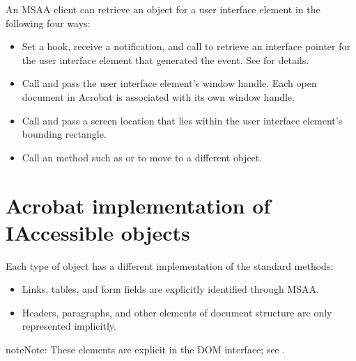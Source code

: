 \documentclass[letterpaper,12pt,english,openany,oneside]{sphinxmanual}
\begin{document}
An MSAA client can retrieve an  object for a user interface element in the following four ways:
\begin{itemize}
\item {} 
Set a  hook, receive a notification, and call  to retrieve an  interface pointer for the user interface element that generated the event. See  for details.

\item {} 
Call  and pass the user interface element’s window handle. Each open document in Acrobat is associated with its own window handle.

\item {} 
Call  and pass a screen location that lies within the user interface element’s bounding rectangle.

\item {} 
Call an  method such as  or  to move to a different  object.

\end{itemize}


\section{Acrobat implementation of IAccessible objects}
\label{\detokenize{MSAA_PDF:acrobat-implementation-of-iaccessible-objects}}
Each type of  object has a different implementation of the standard methods:
\begin{itemize}
\item {} 
Links, tables, and form fields are explicitly identified through MSAA.

\item {} 
Headers, paragraphs, and other elements of document structure are only represented implicitly.

\end{itemize}

\begin{sphinxadmonition}{note}{Note:}
These elements are explicit in the DOM interface; see .
\end{sphinxadmonition}
\end{document}
